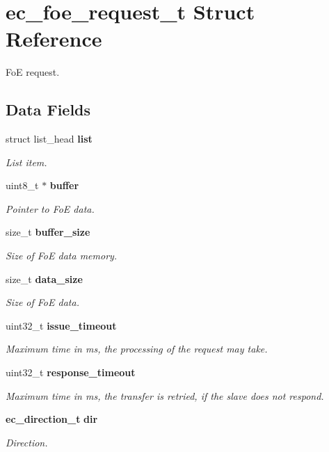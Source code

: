 \section{ec\-\_\-foe\-\_\-request\-\_\-t \-Struct \-Reference}
\label{structec__foe__request__t}


\-Fo\-E request.  


\subsection*{\-Data \-Fields}
\begin{DoxyCompactItemize}
\item 
struct list\-\_\-head {\bf list}
\begin{DoxyCompactList}\small\item\em \-List item. \end{DoxyCompactList}\item 
uint8\-\_\-t $\ast$ {\bf buffer}
\begin{DoxyCompactList}\small\item\em \-Pointer to \-Fo\-E data. \end{DoxyCompactList}\item 
size\-\_\-t {\bf buffer\-\_\-size}
\begin{DoxyCompactList}\small\item\em \-Size of \-Fo\-E data memory. \end{DoxyCompactList}\item 
size\-\_\-t {\bf data\-\_\-size}
\begin{DoxyCompactList}\small\item\em \-Size of \-Fo\-E data. \end{DoxyCompactList}\item 
uint32\-\_\-t {\bf issue\-\_\-timeout}
\begin{DoxyCompactList}\small\item\em \-Maximum time in ms, the processing of the request may take. \end{DoxyCompactList}\item 
uint32\-\_\-t {\bf response\-\_\-timeout}
\begin{DoxyCompactList}\small\item\em \-Maximum time in ms, the transfer is retried, if the slave does not respond. \end{DoxyCompactList}\item 
{\bf ec\-\_\-direction\-\_\-t} {\bf dir}
\begin{DoxyCompactList}\small\item\em \-Direction. \end{DoxyCompactList}\item 

\end{DoxyCompactItemize}
